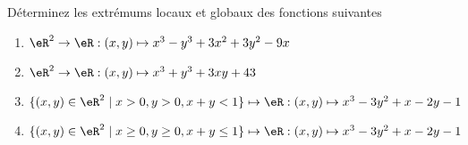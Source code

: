 
\begin{exercice}\label{exoOptimSS0003}

Déterminez les extrémums locaux et globaux des fonctions suivantes
\begin{enumerate}
\item $ \eR^2 \rightarrow \eR : (x,y) \mapsto x^3 -y^3 + 3x^2 +3y^2 -9x $
\item $ \eR^2 \rightarrow \eR : (x,y) \mapsto x^3 + y^3 + 3xy + 43 $
\item $ \{ (x,y) \in \eR^2 \mid x > 0, y > 0, x+y < 1 \} \mapsto  \eR: (x,y) \mapsto x^3 -3y^2 +x -2y -1$
\item $ \{ (x,y) \in \eR^2 \mid x \geq 0, y \geq 0, x+y \leq 1 \} \mapsto  \eR: (x,y) \mapsto x^3 -3y^2 +x -2y -1$
\end{enumerate}

\end{exercice}
